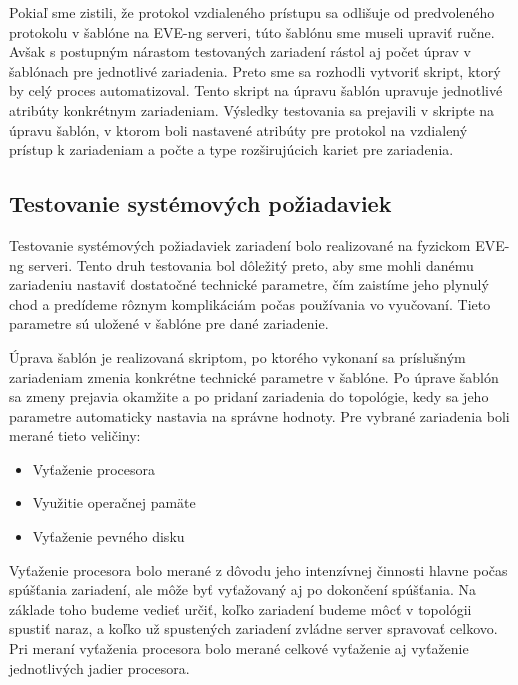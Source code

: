 Pokiaľ sme zistili, že protokol vzdialeného prístupu sa odlišuje od predvoleného protokolu v šablóne na EVE-ng serveri, túto šablónu sme museli upraviť ručne. Avšak s postupným nárastom testovaných zariadení rástol aj počet úprav v šablónach pre jednotlivé zariadenia. Preto sme sa rozhodli vytvoriť skript, ktorý by celý proces automatizoval. Tento skript na úpravu šablón upravuje jednotlivé atribúty konkrétnym zariadeniam. Výsledky testovania sa prejavili v skripte na úpravu šablón, v ktorom  boli nastavené atribúty pre protokol na vzdialený prístup k zariadeniam a počte a type rozširujúcich kariet pre zariadenia.




\subsection{Testovanie systémových požiadaviek}
\label{chap:testovanie_zariadeni_benchmark}

Testovanie systémových požiadaviek zariadení bolo realizované na fyzickom EVE-ng serveri. Tento druh testovania bol dôležitý preto, aby sme mohli danému zariadeniu nastaviť dostatočné technické parametre, čím zaistíme jeho plynulý chod a predídeme rôznym komplikáciám počas používania vo vyučovaní. Tieto parametre sú uložené v šablóne pre dané zariadenie.

Úprava šablón je realizovaná skriptom, po ktorého vykonaní sa príslušným zariadeniam zmenia konkrétne technické parametre v šablóne. Po úprave šablón sa zmeny prejavia okamžite a po pridaní zariadenia do topológie, kedy sa jeho parametre automaticky nastavia na správne hodnoty. Pre vybrané zariadenia boli merané tieto veličiny:

\begin{itemize}[noitemsep]
    \item Vyťaženie procesora
    \item Využitie operačnej pamäte
    \item Vyťaženie pevného disku
\end{itemize}

Vyťaženie procesora bolo merané z dôvodu jeho intenzívnej činnosti hlavne počas spúšťania zariadení, ale môže byť vyťažovaný aj po dokončení spúšťania. Na základe toho budeme vedieť určiť, koľko zariadení budeme môcť v topológii spustiť naraz, a koľko už spustených zariadení zvládne server spravovať celkovo. Pri meraní vyťaženia procesora bolo merané celkové vyťaženie aj vyťaženie jednotlivých jadier procesora.

